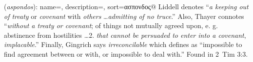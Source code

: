 \item[Irreconcilable,]

(\textit{aspondos}):
{
    name=,
    description={},
    sort=ασπονδος@
}
Liddell denotes ``\emph{a keeping out of treaty} or \emph{covenant} with \emph{others} \ldots \emph{admitting of no truce}.'' Also, Thayer connotes ``\emph{without a treaty or covenant}; of things not mutually agreed upon, e. g. abstinence from hostilities \ldots 2. \emph{that cannot be persuaded to enter into a covenant}, \emph{implacable}.'' Finally, Gingrich says \emph{irreconcilable} which defines as ``impossible to find agreement between or with, or impossible to deal with.''
Found in 2~Tim 3:3.

